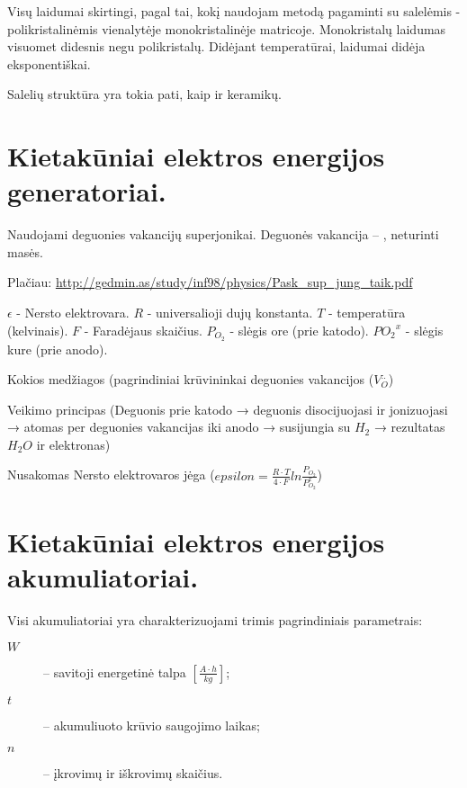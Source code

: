 Visų laidumai skirtingi, pagal tai, kokį naudojam metodą pagaminti su
salelėmis - polikristalinėmis vienalytėje monokristalinėje
matricoje.
Monokristalų laidumas visuomet didesnis negu polikristalų.
Didėjant temperatūrai, laidumai didėja eksponentiškai.

Salelių struktūra yra tokia pati, kaip ir keramikų.

\section{Kietakūniai elektros energijos generatoriai.}

Naudojami deguonies vakancijų superjonikai. Deguonės vakancija – ,
neturinti masės.

Plačiau: \url{http://gedmin.as/study/inf98/physics/Pask_sup_jung_taik.pdf}

$\epsilon$ - Nersto elektrovara.
$R$ - universalioji dujų konstanta.
$T$ - temperatūra (kelvinais).
$F$ - Faradėjaus skaičius.
$P_{O_2}$ - slėgis ore (prie katodo).
$P{O_2}^x$ - slėgis kure (prie anodo).

\begin{remember}
  \item Kokios medžiagos (pagrindiniai krūvininkai deguonies vakancijos
  ($V_{O}^{..}$) 
  \item Veikimo principas (Deguonis prie katodo → deguonis
  disocijuojasi ir jonizuojasi →  atomas per deguonies vakancijas
  iki anodo → susijungia su $H_2$ → rezultatas $H_2 O$ ir elektronas)
  \item Nusakomas Nersto elektrovaros jėga
  ($epsilon = \frac{R \cdot T}{4 \cdot F}ln \frac{P_{O_2}}{P_{O_2}^x}$)
\end{remember}

\section{Kietakūniai elektros energijos akumuliatoriai.}

Visi akumuliatoriai yra charakterizuojami trimis pagrindiniais parametrais:
\begin{description}
  \item[$W$]  – savitoji energetinė talpa
    $\left[ \frac{A \cdot h}{kg} \right]$;
  \item[$t$] – akumuliuoto krūvio saugojimo laikas;
  \item[$n$] – įkrovimų ir iškrovimų skaičius.
\end{description}

